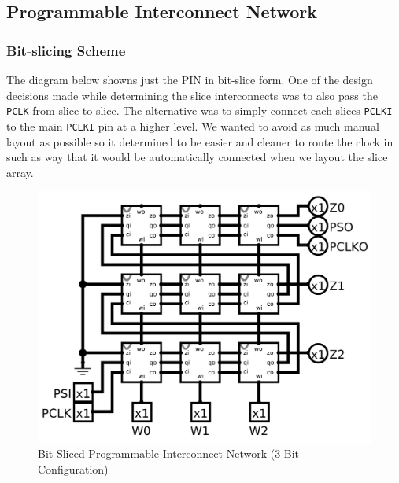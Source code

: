 \documentclass{article}
\begin{document}
    \newpage
    \subsection{Programmable Interconnect Network}

        \subsubsection{Bit-slicing Scheme}
        The diagram below showns just the PIN in bit-slice form. One of the
        design decisions made while determining the slice interconnects was to
        also pass the \texttt{PCLK} from slice to slice. The alternative was to
        simply connect each slices \texttt{PCLKI} to the main \texttt{PCLKI}
        pin at a higher level. We wanted to avoid as much manual layout as
        possible so it determined to be easier and cleaner to route the clock
        in such as way that it would be automatically connected when we layout
        the slice array.
        \begin{figure}[H]
            \centering
            \includegraphics[width=0.5\linewidth]{../../logisim/pin.png}
            \caption{Bit-Sliced Programmable Interconnect Network (3-Bit Configuration)}
        \end{figure}
\end{document}
